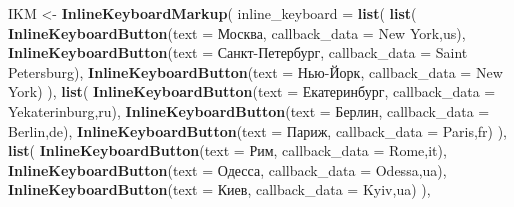 \documentclass[
]{book}
\newenvironment{Shaded}{\begin{snugshade}}{\end{snugshade}}
\newcommand{\AttributeTok}[1]{\textcolor[rgb]{0.13,0.29,0.53}{#1}}
\newcommand{\FunctionTok}[1]{\textcolor[rgb]{0.13,0.29,0.53}{\textbf{#1}}}
\newcommand{\NormalTok}[1]{#1}
\newcommand{\OtherTok}[1]{\textcolor[rgb]{0.56,0.35,0.01}{#1}}
\newcommand{\StringTok}[1]{\textcolor[rgb]{0.31,0.60,0.02}{#1}}
\begin{document}
\begin{Shaded}
\begin{Highlighting}[]
\NormalTok{  IKM }\OtherTok{\textless{}{-}} \FunctionTok{InlineKeyboardMarkup}\NormalTok{(}
    \AttributeTok{inline\_keyboard =} \FunctionTok{list}\NormalTok{(}
      \FunctionTok{list}\NormalTok{(}
        \FunctionTok{InlineKeyboardButton}\NormalTok{(}\AttributeTok{text =} \StringTok{\textquotesingle{}Москва\textquotesingle{}}\NormalTok{, }\AttributeTok{callback\_data =} \StringTok{\textquotesingle{}New York,us\textquotesingle{}}\NormalTok{),}
        \FunctionTok{InlineKeyboardButton}\NormalTok{(}\AttributeTok{text =} \StringTok{\textquotesingle{}Санкт{-}Петербург\textquotesingle{}}\NormalTok{, }\AttributeTok{callback\_data =} \StringTok{\textquotesingle{}Saint Petersburg\textquotesingle{}}\NormalTok{),}
        \FunctionTok{InlineKeyboardButton}\NormalTok{(}\AttributeTok{text =} \StringTok{\textquotesingle{}Нью{-}Йорк\textquotesingle{}}\NormalTok{, }\AttributeTok{callback\_data =} \StringTok{\textquotesingle{}New York\textquotesingle{}}\NormalTok{)}
\NormalTok{      ),}
      \FunctionTok{list}\NormalTok{(}
        \FunctionTok{InlineKeyboardButton}\NormalTok{(}\AttributeTok{text =} \StringTok{\textquotesingle{}Екатеринбург\textquotesingle{}}\NormalTok{, }\AttributeTok{callback\_data =} \StringTok{\textquotesingle{}Yekaterinburg,ru\textquotesingle{}}\NormalTok{),}
        \FunctionTok{InlineKeyboardButton}\NormalTok{(}\AttributeTok{text =} \StringTok{\textquotesingle{}Берлин\textquotesingle{}}\NormalTok{, }\AttributeTok{callback\_data =} \StringTok{\textquotesingle{}Berlin,de\textquotesingle{}}\NormalTok{),}
        \FunctionTok{InlineKeyboardButton}\NormalTok{(}\AttributeTok{text =} \StringTok{\textquotesingle{}Париж\textquotesingle{}}\NormalTok{, }\AttributeTok{callback\_data =} \StringTok{\textquotesingle{}Paris,fr\textquotesingle{}}\NormalTok{)}
\NormalTok{      ),}
      \FunctionTok{list}\NormalTok{(}
        \FunctionTok{InlineKeyboardButton}\NormalTok{(}\AttributeTok{text =} \StringTok{\textquotesingle{}Рим\textquotesingle{}}\NormalTok{, }\AttributeTok{callback\_data =} \StringTok{\textquotesingle{}Rome,it\textquotesingle{}}\NormalTok{),}
        \FunctionTok{InlineKeyboardButton}\NormalTok{(}\AttributeTok{text =} \StringTok{\textquotesingle{}Одесса\textquotesingle{}}\NormalTok{, }\AttributeTok{callback\_data =} \StringTok{\textquotesingle{}Odessa,ua\textquotesingle{}}\NormalTok{),}
        \FunctionTok{InlineKeyboardButton}\NormalTok{(}\AttributeTok{text =} \StringTok{\textquotesingle{}Киев\textquotesingle{}}\NormalTok{, }\AttributeTok{callback\_data =} \StringTok{\textquotesingle{}Kyiv,ua\textquotesingle{}}\NormalTok{)}
\NormalTok{      ),}

\end{Highlighting}
\end{Shaded}
\end{document}
